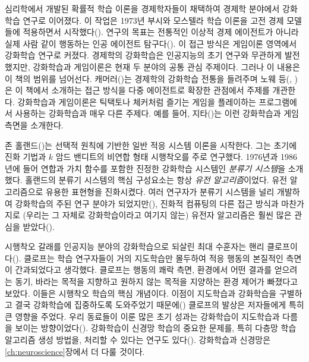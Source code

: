 심리학에서 개발된 확률적 학습 이론을 경제학자들이 채택하여 경제학 분야에서
강화학습 연구로 이어졌다. 이 작업은 1973년 부시와 모스텔라 학습 이론을 고전 경제
모델들에 적용하면서 시작했다(\cite{Cross1973}). 연구의 목표는 전통적인 이상적
경제 에이전트가 아니라 실제 사람 같이 행동하는 인공 에이전트
탐구다(\cite{Arthur1991}). 이 접근 방식은 게임이론 영역에서 강화학습 연구로
커졌다. 경제학의 강화학습은 인공지능의 초기 연구와 무관하게 발전했지만,
강화학습과 게임이론은 현재 두 분야의 공통 관심 주제이다. 그러나 이 내용은 이
책의 범위를 넘어선다. 캐머러(\cite{Camerer2003})는 경제학의 강화학습 전통을
들려주며 노웨 등(\citeauthor*{NoweVrancxHauwere2012},
\cite*{NoweVrancxHauwere2012})은 이 책에서 소개하는 접근 방식을 다중 에이전트로
확장한 관점에서 주제를 개관한다. 강화학습과 게임이론은 틱택토나 체커처럼 즐기는
게임을 플레이하는 프로그램에서 사용하는 강화학습과 매우 다른 주제다. 예를 들어,
지타(\cite{Szita2012})는 이런 강화학습과 게임 측면을 소개한다.

존 홀랜드(\cite{Holland1975})는 선택적 원칙에 기반한 일반 적응 시스템 이론을
시작한다. 그는 초기에 진화 기법과 $k$ 암드 밴디트의 비연합 형태 시행착오를 주로
연구했다. 1976년과 1986년에 들어 연합과 가치 함수를 포함한 진정한 강화학습
시스템인 \emph{분류기 시스템}을 소개했다. 홀랜드의 분류기 시스템의 핵심
구성요소는 항상 \emph{유전 알고리즘}이었다. 유전 알고리즘으로 유용한 표현형을
진화시켰다. 여러 연구자가 분류기 시스템을 널리 개발하여 강화학습의 주된 연구
분야가 되었지만(\cite{UrbanowiczMoore2009}), 진화적 컴퓨팅의 다른 접근 방식과
마찬가지로 (우리는 그 자체로 강화학습이라고 여기지 않는) 유전자 알고리즘은 훨씬
많은 관심을 받았다(\cite[예,][]{FogelOwensWalsh1966, Koza1992}).


시행착오 갈래를 인공지능 분야의 강화학습으로 되살린 최대 수훈자는 핸리
클로프이다(\cite{Klopf1972, Klopf1975, Klopf1982}). 클로프는 학습 연구자들이
거의 지도학습만 몰두하여 적응 행동의 본질적인 측면이 간과되었다고 생각했다.
클로프는 행동의 쾌락 측면, 환경에서 어떤 결과를 얻으려는 동기, 바라는 목적을
지향하고 원하지 않는 목적을 지양하는 환경 제어가 빠졌다고 보았다. 이들은
시행착오 학습의 핵심 개념이다. 이점이 지도학습과 강화학습을 구별하고 결국
강화학습에 집중하도록 도와주었기 때문에(\cite{BartoSutton1981a}) 클로프의 발상은
저자들에게 특히 큰 영향을 주었다. 우리 동료들이 이룬 많은 초기 성과는 강화학습이
지도학습과 다름을 보이는 방향이었다(\cite{BartoSuttonBrouwer1981,
BartoSutton1981b, BartoAnandan1985}). 강화학습이 신경망 학습의 중요한 문제를,
특히 다층망 학습 알고리즘 생성 방법을, 처리할 수 있다는 연구도
있다(\cite{BartoAndersonSutton1982, BartoAnderson1985, BartoAnandan1985,
Barto1985, Barto1986, BartoJordan1987}). 강화학습과 신경망은
\ref{ch:neuroscience}장에서 더 다룰 것이다.

